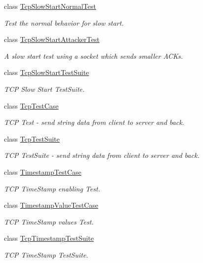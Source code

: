 \begin{DoxyCompactItemize}
class \hyperlink{classTcpSlowStartNormalTest}{Tcp\+Slow\+Start\+Normal\+Test}
\begin{DoxyCompactList}\small\item\em Test the normal behavior for slow start. \end{DoxyCompactList}\item 
class \hyperlink{classTcpSlowStartAttackerTest}{Tcp\+Slow\+Start\+Attacker\+Test}
\begin{DoxyCompactList}\small\item\em A slow start test using a socket which sends smaller A\+C\+Ks. \end{DoxyCompactList}\item 
class \hyperlink{classTcpSlowStartTestSuite}{Tcp\+Slow\+Start\+Test\+Suite}
\begin{DoxyCompactList}\small\item\em T\+CP Slow Start Test\+Suite. \end{DoxyCompactList}\item 
class \hyperlink{classTcpTestCase}{Tcp\+Test\+Case}
\begin{DoxyCompactList}\small\item\em T\+CP Test -\/ send string data from client to server and back. \end{DoxyCompactList}\item 
class \hyperlink{classTcpTestSuite}{Tcp\+Test\+Suite}
\begin{DoxyCompactList}\small\item\em T\+CP Test\+Suite -\/ send string data from client to server and back. \end{DoxyCompactList}\item 
class \hyperlink{classTimestampTestCase}{Timestamp\+Test\+Case}
\begin{DoxyCompactList}\small\item\em T\+CP Time\+Stamp enabling Test. \end{DoxyCompactList}\item 
class \hyperlink{classTimestampValueTestCase}{Timestamp\+Value\+Test\+Case}
\begin{DoxyCompactList}\small\item\em T\+CP Time\+Stamp values Test. \end{DoxyCompactList}\item 
class \hyperlink{classTcpTimestampTestSuite}{Tcp\+Timestamp\+Test\+Suite}
\begin{DoxyCompactList}\small\item\em T\+CP Time\+Stamp Test\+Suite. \end{DoxyCompactList}\item 

\end{DoxyCompactItemize}
